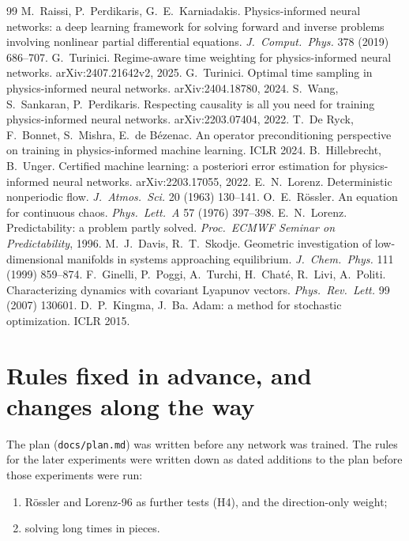 \documentclass[11pt,a4paper]{article}
\begin{document}
\begin{thebibliography}{99}
 M.~Raissi, P.~Perdikaris, G.~E.~Karniadakis. Physics-informed neural
networks: a deep learning framework for solving forward and inverse problems involving
nonlinear partial differential equations. \emph{J.\ Comput.\ Phys.} 378 (2019) 686--707.
 G.~Turinici. Regime-aware time weighting for physics-informed neural
networks. arXiv:2407.21642v2, 2025.
 G.~Turinici. Optimal time sampling in physics-informed neural
networks. arXiv:2404.18780, 2024.
 S.~Wang, S.~Sankaran, P.~Perdikaris. Respecting causality is all you need
for training physics-informed neural networks. arXiv:2203.07404, 2022.
 T.~De Ryck, F.~Bonnet, S.~Mishra, E.~de B\'ezenac. An operator
preconditioning perspective on training in physics-informed machine learning. ICLR 2024.
 B.~Hillebrecht, B.~Unger. Certified machine learning: a posteriori
error estimation for physics-informed neural networks. arXiv:2203.17055, 2022.
 E.~N.~Lorenz. Deterministic nonperiodic flow. \emph{J.\ Atmos.\ Sci.} 20
(1963) 130--141.
 O.~E.~R\"ossler. An equation for continuous chaos. \emph{Phys.\ Lett.\
A} 57 (1976) 397--398.
 E.~N.~Lorenz. Predictability: a problem partly solved. \emph{Proc.\
ECMWF Seminar on Predictability}, 1996.
\bibitem{davis1999} M.~J.~Davis, R.~T.~Skodje. Geometric investigation of low-dimensional
manifolds in systems approaching equilibrium. \emph{J.\ Chem.\ Phys.} 111 (1999) 859--874.
\bibitem{ginelli2007} F.~Ginelli, P.~Poggi, A.~Turchi, H.~Chat\'e, R.~Livi, A.~Politi.
Characterizing dynamics with covariant Lyapunov vectors. \emph{Phys.\ Rev.\ Lett.} 99 (2007)
130601.
\bibitem{kingma2015} D.~P.~Kingma, J.~Ba. Adam: a method for stochastic optimization. ICLR
2015.
\end{thebibliography}

\appendix
\section{Rules fixed in advance, and changes along the way}
\label{app:amend}
The plan (\texttt{docs/plan.md}) was written before any network was trained. The rules for the
later experiments were written down as dated additions to the plan before those experiments
were run:
\begin{enumerate}
\item Rössler and Lorenz-96 as further tests (H4), and the direction-only weight;
\item solving long times in pieces.
\end{enumerate}
\end{document}

